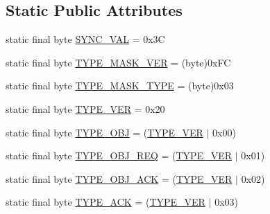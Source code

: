 \subsection*{\-Static \-Public \-Attributes}
\begin{DoxyCompactItemize}
\item 
static final byte \hyperlink{classorg_1_1taulabs_1_1uavtalk_1_1_u_a_v_talk_definitions_ab9a3933958fa17bdca2c3f17277e8303}{\-S\-Y\-N\-C\-\_\-\-V\-A\-L} = 0x3\-C
\item 
static final byte \hyperlink{classorg_1_1taulabs_1_1uavtalk_1_1_u_a_v_talk_definitions_a8eea7af49e3c741562806cf8460f4100}{\-T\-Y\-P\-E\-\_\-\-M\-A\-S\-K\-\_\-\-V\-E\-R} = (byte)0x\-F\-C
\item 
static final byte \hyperlink{classorg_1_1taulabs_1_1uavtalk_1_1_u_a_v_talk_definitions_a6ccf2b527d322fdf522976dfcdae2054}{\-T\-Y\-P\-E\-\_\-\-M\-A\-S\-K\-\_\-\-T\-Y\-P\-E} = (byte)0x03
\item 
static final byte \hyperlink{classorg_1_1taulabs_1_1uavtalk_1_1_u_a_v_talk_definitions_af6183c1302cd3c3ea3e7a4bb929c73ea}{\-T\-Y\-P\-E\-\_\-\-V\-E\-R} = 0x20
\item 
static final byte \hyperlink{classorg_1_1taulabs_1_1uavtalk_1_1_u_a_v_talk_definitions_a8d3182c07dcec00e768a95276d933f3b}{\-T\-Y\-P\-E\-\_\-\-O\-B\-J} = (\hyperlink{classorg_1_1taulabs_1_1uavtalk_1_1_u_a_v_talk_definitions_af6183c1302cd3c3ea3e7a4bb929c73ea}{\-T\-Y\-P\-E\-\_\-\-V\-E\-R} $|$ 0x00)
\item 
static final byte \hyperlink{classorg_1_1taulabs_1_1uavtalk_1_1_u_a_v_talk_definitions_aa74f8daf3b9aa068ac33662627f7ebbd}{\-T\-Y\-P\-E\-\_\-\-O\-B\-J\-\_\-\-R\-E\-Q} = (\hyperlink{classorg_1_1taulabs_1_1uavtalk_1_1_u_a_v_talk_definitions_af6183c1302cd3c3ea3e7a4bb929c73ea}{\-T\-Y\-P\-E\-\_\-\-V\-E\-R} $|$ 0x01)
\item 
static final byte \hyperlink{classorg_1_1taulabs_1_1uavtalk_1_1_u_a_v_talk_definitions_aa928ea5500dca695f867128fe890741f}{\-T\-Y\-P\-E\-\_\-\-O\-B\-J\-\_\-\-A\-C\-K} = (\hyperlink{classorg_1_1taulabs_1_1uavtalk_1_1_u_a_v_talk_definitions_af6183c1302cd3c3ea3e7a4bb929c73ea}{\-T\-Y\-P\-E\-\_\-\-V\-E\-R} $|$ 0x02)
\item 
static final byte \hyperlink{classorg_1_1taulabs_1_1uavtalk_1_1_u_a_v_talk_definitions_a2108eedbfe1b9c6fd6dbc497282b444c}{\-T\-Y\-P\-E\-\_\-\-A\-C\-K} = (\hyperlink{classorg_1_1taulabs_1_1uavtalk_1_1_u_a_v_talk_definitions_af6183c1302cd3c3ea3e7a4bb929c73ea}{\-T\-Y\-P\-E\-\_\-\-V\-E\-R} $|$ 0x03)
\end{DoxyCompactItemize}


